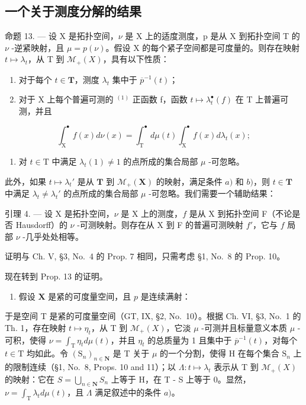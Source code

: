 \subsection{一个关于测度分解的结果}

命题 13. --- 设 X 是拓扑空间，\(\nu\) 是 X 上的适度测度，p 是从 X 到拓扑空间 T 的 \(\nu\) -逆紧映射，且 \(\mu = p(\nu)\)。假设 X 的每个紧子空间都是可度量的。则存在映射 \(t \mapsto \lambda_{t}\)，从 T 到 \(\mathcal{M}_{+}(X)\)，具有以下性质：

\begin{enumerate}
\def\labelenumi{\alph{enumi})}
\item
  对于每个 \(t \in \mathbf{T}\)，测度 \(\lambda_t\) 集中于 \(\overline{p}^{-1}(t)\)；
\item
  对于 X 上每个普遍可测的 \(^{(1)}\) 正函数 f，函数 \(t \mapsto \lambda_{t}^{\bullet}(f)\) 在 T 上普遍可测，并且
\end{enumerate}

\[
\int_ {\mathrm{X}} ^ {\bullet} f (x) d \nu (x) = \int_ {\mathrm{T}} ^ {\bullet} d \mu (t) \int_ {\mathrm{X}} ^ {\bullet} f (x) d \lambda_ {t} (x);\tag{12}
\]

\begin{enumerate}
\def\labelenumi{\alph{enumi})}
\setcounter{enumi}{2}
\tightlist
\item
  对 \(t \in \mathrm{T}\) 中满足 \(\lambda_t(1) \neq 1\) 的点所成的集合局部 \(\mu\) -可忽略。
\end{enumerate}

此外，如果 \(t \mapsto \lambda_t'\) 是从 \(\mathbf{T}\) 到 \(\mathcal{M}_+(\mathbf{X})\) 的映射，满足条件 \(a)\) 和 \(b)\)，则 \(t \in \mathbf{T}\) 中满足 \(\lambda_t \neq \lambda_t'\) 的点所成的集合局部 \(\mu\) -可忽略。我们需要一个辅助结果：

引理 4. --- 设 X 是拓扑空间，\(\nu\) 是 X 上的测度，\(f\) 是从 X 到拓扑空间 F（不论是否 Hausdorff）的 \(\nu\) -可测映射。则存在从 X 到 F 的普遍可测映射 \(f'\)，它与 \(f\) 局部 \(\nu\) -几乎处处相等。

证明与 Ch. V, §3, No.~4 的 Prop. 7 相同，只需考虑 §1, No.~8 的 Prop. 10。

现在转到 Prop. 13 的证明。

\begin{enumerate}
\def\labelenumi{\Alph{enumi})}
\tightlist
\item
  假设 \(\mathbf{X}\) 是紧的可度量空间，且 \(p\) 是连续满射：
\end{enumerate}

于是空间 T 是紧的可度量空间（GT, IX, §2, No.~10）。根据 Ch. VI, §3, No.~1 的 Th. 1，存在映射 \(t \mapsto \eta_t\)，从 T 到 \(\mathcal{M}_+(X)\)，它淡 \(\mu\) -可测并且标量意义本质 \(\mu\) -可积，使得 \(\nu = \int_{\mathrm{T}} \eta_t d\mu(t)\)，并且 \(\eta_t\) 的总质量为 1 且集中于 \(\overline{p}^{-1}(t)\)，对每个 \(t \in \mathrm{T}\) 均如此。令 \((\mathrm{S}_n)_{n \in \mathbf{N}}\) 是 T 关于 \(\mu\) 的一个分割，使得 H 在每个集合 \(\mathrm{S}_n\) 上的限制连续（§1, No.~8, Props. 10 and 11）；以 \(\Lambda: t \mapsto \lambda_t\) 表示从 T 到 \(\mathcal{M}_+(X)\) 的映射：它在 \(S = \bigcup_{n \in \mathbf{N}} S_n\) 上等于 H，在 T - S 上等于 0。显然，\(\nu = \int_{\mathrm{T}}\lambda_t d\mu (t)\)，且 \(\Lambda\) 满足叙述中的条件 \(a)\)。

